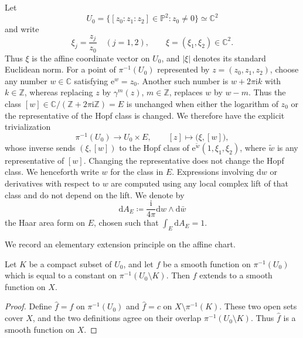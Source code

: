 \documentclass[11pt,a4paper]{article}
\begin{document}
	Let
	\[
	U_0=\{[z_0:z_1:z_2]\in\mathbb P^2:z_0\ne0\}\simeq\mathbb C^2
	\]
	and write
	\[
	\xi_j=\frac{z_j}{z_0}\quad(j=1,2),
	\qquad
	\xi=(\xi_1,\xi_2)\in\mathbb C^2.
	\]
	Thus $\xi$ is the affine coordinate vector on $U_0$, and $|\xi|$ denotes
	its standard Euclidean norm.  For a point of $\pi^{-1}(U_0)$ represented
	by $z=(z_0,z_1,z_2)$, choose any number $w\in\mathbb C$ satisfying
	$\mathrm{e}^{w}=z_0$.  Another such number is $w+2\pi\mathrm{i}k$
	with $k\in\mathbb Z$, whereas replacing $z$ by $\gamma^m(z)$,
	$m\in\mathbb Z$, replaces $w$ by $w-m$.
	Thus the class
	$
	[w]\in\mathbb C/(\mathbb Z+2\pi\mathrm{i}\mathbb Z)=E
	$
	is unchanged when either the logarithm of $z_0$ or the representative
	of the Hopf class is changed.  We therefore have the explicit
	trivialization
	\begin{equation}
		\pi^{-1}(U_0)\longrightarrow U_0\times E,
		\qquad
		[z]\longmapsto\bigl(\xi,[w]\bigr),
		\label{eq:affine-trivialization}
	\end{equation}
	whose inverse sends $(\xi,[w])$ to the Hopf class of
	$\mathrm{e}^{\widetilde w}(1,\xi_1,\xi_2)$, where $\widetilde w$ is any
	representative of $[w]$.  Changing the representative does not change the
	Hopf class.  We henceforth write $w$ for the class in $E$.  Expressions
	involving $\mathrm{d}w$ or derivatives with respect to $w$ are computed
	using any local complex lift of that class and do not depend on the lift.
	We denote by
	\begin{equation}\label{eq:def-dA}
		\mathrm{d}A_E\coloneqq \frac{\mathrm{i}}{4\pi}\mathrm{d}w\wedge \mathrm{d}\bar w
	\end{equation}
	the Haar area form on $E$, chosen such that
	$\int_E\mathrm{d}A_E=1$.

	We record an elementary extension principle on
	the affine chart.

	\begin{lemma}\label{lem:extension}
		Let $K$ be a compact subset of $U_0$, and let $f$ be a smooth
		function on $\pi^{-1}(U_0)$ which is equal to a constant on
		$\pi^{-1}(U_0\setminus K)$.  Then $f$ extends to a smooth function
		on $X$.
	\end{lemma}

	\begin{proof}
		Define $\widehat f=f$ on $\pi^{-1}(U_0)$ and $\widehat f=c$ on
		$X\setminus\pi^{-1}(K)$.  These two open sets cover $X$, and the two
		definitions agree on their overlap $\pi^{-1}(U_0\setminus K)$.  Thus
		$\widehat f$ is a smooth function on $X$.
	\end{proof}
\end{document}
